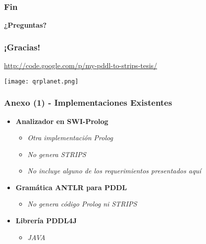 \documentclass[bigger]{beamer}
\begin{document}
\begin{frame}
\frametitle{Fin}
\label{sec-6.7}

\hspace{4.5cm}
{\bf ¿Preguntas?}
\end{frame}
\begin{frame}
\frametitle{¡Gracias!}
\label{sec-6.8}

\href{http://code.google.com/p/my-pddl-to-strips-tesis/}{http://code.google.com/p/my-pddl-to-strips-tesis/}
\begin{center}\texttt{[image: qrplanet.png]}\end{center}
\end{frame}
\begin{frame}[<+->]
\frametitle{Anexo (1) - Implementaciones Existentes}
\label{sec-6.9}
\begin{itemize}

\item \textbf{Analizador en SWI-Prolog}
\label{sec-6.9.1}%
\begin{itemize}

\item \emph{Otra implementación Prolog}\\
\label{sec-6.9.1.1}%
\item \emph{No genera STRIPS}\\
\label{sec-6.9.1.2}%
\item \emph{No incluye alguno de los requerimientos presentados aquí}\\
\label{sec-6.9.1.3}%
\end{itemize} %

\item \textbf{Gramática ANTLR para PDDL}
\label{sec-6.9.2}%
\begin{itemize}

\item \emph{No genera código Prolog ni STRIPS}\\
\label{sec-6.9.2.1}%
\end{itemize} %

\item \textbf{Librería PDDL4J}
\label{sec-6.9.3}%
\begin{itemize}

\item \emph{JAVA}\\
\label{sec-6.9.3.1}%
\end{itemize} %
\end{itemize} %
\end{frame}
\end{document}
